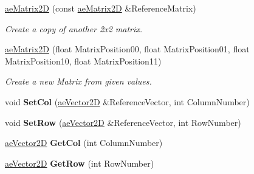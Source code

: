 \begin{DoxyCompactItemize}
\item 
\hyperlink{structae_core_1_1ae_matrix2_d_a15a2215718c50aa4afd5b789561b2808}{ae\+Matrix2D} (const \hyperlink{structae_core_1_1ae_matrix2_d}{ae\+Matrix2D} \&Reference\+Matrix)\hypertarget{structae_core_1_1ae_matrix2_d_a15a2215718c50aa4afd5b789561b2808}{}\label{structae_core_1_1ae_matrix2_d_a15a2215718c50aa4afd5b789561b2808}

\begin{DoxyCompactList}\small\item\em Create a copy of another 2x2 matrix. \end{DoxyCompactList}\item 
\hyperlink{structae_core_1_1ae_matrix2_d_a38c7287f204fa315d9992efed570cbbc}{ae\+Matrix2D} (float Matrix\+Position00, float Matrix\+Position01, float Matrix\+Position10, float Matrix\+Position11)\hypertarget{structae_core_1_1ae_matrix2_d_a38c7287f204fa315d9992efed570cbbc}{}\label{structae_core_1_1ae_matrix2_d_a38c7287f204fa315d9992efed570cbbc}

\begin{DoxyCompactList}\small\item\em Create a new Matrix from given values. \end{DoxyCompactList}\item 
void {\bfseries Set\+Col} (\hyperlink{structae_core_1_1ae_vector2_d}{ae\+Vector2D} \&Reference\+Vector, int Column\+Number)\hypertarget{structae_core_1_1ae_matrix2_d_aeb1cd1951ccad5730a9d267cca82bb8e}{}\label{structae_core_1_1ae_matrix2_d_aeb1cd1951ccad5730a9d267cca82bb8e}

\item 
void {\bfseries Set\+Row} (\hyperlink{structae_core_1_1ae_vector2_d}{ae\+Vector2D} \&Reference\+Vector, int Row\+Number)\hypertarget{structae_core_1_1ae_matrix2_d_a1bbd6441ac4fa24d882b6ca2e7fcb8ab}{}\label{structae_core_1_1ae_matrix2_d_a1bbd6441ac4fa24d882b6ca2e7fcb8ab}

\item 
\hyperlink{structae_core_1_1ae_vector2_d}{ae\+Vector2D} {\bfseries Get\+Col} (int Column\+Number)\hypertarget{structae_core_1_1ae_matrix2_d_a61d4de78c33b0f97b919f09629bd6e23}{}\label{structae_core_1_1ae_matrix2_d_a61d4de78c33b0f97b919f09629bd6e23}

\item 
\hyperlink{structae_core_1_1ae_vector2_d}{ae\+Vector2D} {\bfseries Get\+Row} (int Row\+Number)\hypertarget{structae_core_1_1ae_matrix2_d_a167210307b3bd4dd89cfa62b6b99f83d}{}\label{structae_core_1_1ae_matrix2_d_a167210307b3bd4dd89cfa62b6b99f83d}


\end{DoxyCompactItemize}
